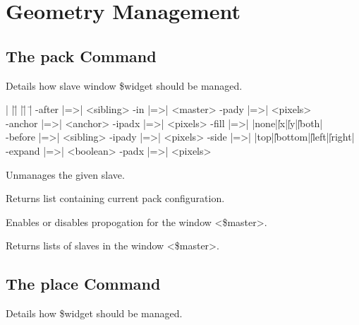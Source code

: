 
\section{Geometry Management}

\subsection*{The pack Command}
\vspace{-4pt}
\begin{enum}{1cm}

Details how slave window \$widget should be managed.

\end{enum}

\begin{tabbing}
|  |\=|               |\=|              |\= \kill
   \> -after |=>| <sibling>  \> -in |=>| <master>     \> -pady |=>| <pixels> \\ 
   \> -anchor |=>| <anchor>	\> -ipadx |=>| <pixels>  \> -fill |=>| |none|\||x|\||y|\||both| \\
   \> -before |=>| <sibling>	\>  -ipady |=>| <pixels> \> -side |=>| |top|\||bottom|\||left|\||right| \\
   \> -expand |=>| <boolean> \>  -padx |=>| <pixels> \\  
\end{tabbing}

\begin{enum}{1cm}

Unmanages the given slave.

Returns list containing current pack configuration.

Enables or disables propogation for the window <\$master>.

Returns lists of slaves in the window <\$master>.

\end{enum}

\subsection*{The place Command}
\vspace{-4pt}
\begin{enum}{1cm}

Details how \$widget should be managed.

\end{enum}

